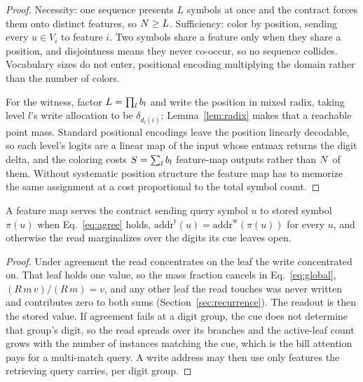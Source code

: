 \begin{proof}
Necessity: one sequence presents $L$ symbols at once and the contract forces them onto distinct features, so $N \ge L$. Sufficiency: color by position, sending every $u \in V_i$ to feature $i$. Two symbols share a feature only when they share a position, and disjointness means they never co-occur, so no sequence collides. Vocabulary sizes do not enter, positional encoding multiplying the domain rather than the number of colors.

For the witness, factor $L = \prod_l b_l$ and write the position in mixed radix, taking level $l$'s write allocation to be $\delta_{d_l(i)}$; Lemma~\ref{lem:radix} makes that a reachable point mass. Standard positional encodings leave the position linearly decodable, so each level's logits are a linear map of the input whose entmax returns the digit delta, and the coloring costs $S = \sum_l b_l$ feature-map outputs rather than $N$ of them. Without systematic position structure the feature map has to memorize the same assignment at a cost proportional to the total symbol count.
\end{proof}

\begin{lemma}
\label{lem:agree}
A feature map serves the contract sending query symbol $u$ to stored symbol $\pi(u)$ when Eq.~\eqref{eq:agree} holds, $\mathrm{addr}^{\mathrm{r}}(u) = \mathrm{addr}^{\mathrm{w}}(\pi(u))$ for every $u$, and otherwise the read marginalizes over the digits its cue leaves open.
\end{lemma}

\begin{proof}
Under agreement the read concentrates on the leaf the write concentrated on. That leaf holds one value, so the mass fraction cancels in Eq.~\eqref{eq:global}, $(R\,m\,v)/(R\,m) = v$, and any other leaf the read touches was never written and contributes zero to both sums (Section~\ref{sec:recurrence}). The readout is then the stored value. If agreement fails at a digit group, the cue does not determine that group's digit, so the read spreads over its branches and the active-leaf count grows with the number of instances matching the cue, which is the bill attention pays for a multi-match query. A write address may then use only features the retrieving query carries, per digit group.
\end{proof}

